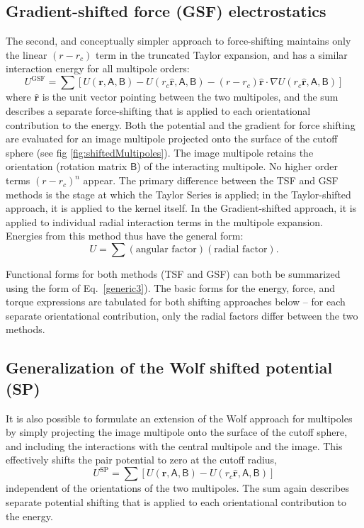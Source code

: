 \subsection{Gradient-shifted force (GSF) electrostatics}
The second, and conceptually simpler approach to force-shifting
maintains only the linear $(r-r_c)$ term in the truncated Taylor
expansion, and has a similar interaction energy for all multipole
orders:
\begin{equation}
U^{\text{GSF}} = \sum \left[ U(\mathbf{r}, \mathsf{A}, \mathsf{B}) -
U(r_c \hat{\mathbf{r}},\mathsf{A}, \mathsf{B}) - (r-r_c)
\hat{\mathbf{r}} \cdot \nabla U(r_c \hat{\mathbf{r}},\mathsf{A}, \mathsf{B}) \right]
\label{generic2}
\end{equation}
where $\hat{\mathbf{r}}$ is the unit vector pointing between the two
multipoles, and the sum describes a separate force-shifting that is
applied to each orientational contribution to the energy.  Both the
potential and the gradient for force shifting are evaluated for an
image multipole projected onto the surface of the cutoff sphere (see
fig \ref{fig:shiftedMultipoles}).  The image multipole retains the
orientation (rotation matrix $\mathsf{B}$) of the interacting multipole.  No
higher order terms $(r-r_c)^n$ appear.  The primary difference between
the TSF and GSF methods is the stage at which the Taylor Series is
applied; in the Taylor-shifted approach, it is applied to the kernel
itself.  In the Gradient-shifted approach, it is applied to individual
radial interaction terms in the multipole expansion.  Energies from
this method thus have the general form:
\begin{equation}
U= \sum  (\text{angular factor}) (\text{radial factor}).
\label{generic3}
\end{equation}

Functional forms for both methods (TSF and GSF) can both be summarized
using the form of Eq.~\ref{generic3}).  The basic forms for the
energy, force, and torque expressions are tabulated for both shifting
approaches below -- for each separate orientational contribution, only
the radial factors differ between the two methods.

\subsection{Generalization of the Wolf shifted potential (SP)}
It is also possible to formulate an extension of the Wolf approach for
multipoles by simply projecting the image multipole onto the surface
of the cutoff sphere, and including the interactions with the central
multipole and the image.  This effectively shifts the pair potential
to zero at the cutoff radius,
\begin{equation}
U^{\text{SP}} = \sum \left[ U(\mathbf{r}, \mathsf{A}, \mathsf{B}) -
U(r_c \hat{\mathbf{r}},\mathsf{A}, \mathsf{B}) \right]
\label{eq:SP}
\end{equation}
independent of the orientations of the two multipoles.  The sum again
describes separate potential shifting that is applied to each
orientational contribution to the energy.
 
